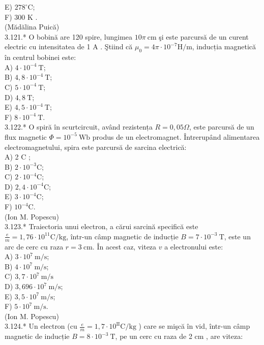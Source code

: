 \documentclass[10pt]{article}
\begin{document}
E) $278^{\circ} \mathrm{C}$;\\
F) 300 K .\\
(Mădălina Puică)\\
3.121.* O bobină are 120 spire, lungimea $10 \pi \mathrm{~cm}$ şi este parcursă de un curent electric cu intensitatea de 1 A . Ştiind că $\mu_{0}=4 \pi \cdot 10^{-7} \mathrm{H} / \mathrm{m}$, inducția magnetică în centrul bobinei este:\\
A) $4 \cdot 10^{-4} \mathrm{~T}$;\\
B) $4,8 \cdot 10^{-4} \mathrm{~T}$;\\
C) $5 \cdot 10^{-4} \mathrm{~T}$;\\
D) $4,8 \mathrm{~T}$;\\
E) $4,5 \cdot 10^{-4} \mathrm{~T}$;\\
F) $8 \cdot 10^{-4} \mathrm{~T}$.\\
3.122.* O spiră în scurtcircuit, având rezistența $R=0,05 \Omega$, este parcursă de un flux magnetic $\Phi=10^{-5} \mathrm{~Wb}$ produs de un electromagnet. Întrerupând alimentarea electromagnetului, spira este parcursă de sarcina electrică:\\
A) 2 C ;\\
B) $2 \cdot 10^{-3} \mathrm{C}$;\\
C) $2 \cdot 10^{-4} \mathrm{C}$;\\
D) $2,4 \cdot 10^{-4} \mathrm{C}$;\\
E) $3 \cdot 10^{-4} \mathrm{C}$;\\
F) $10^{-4} \mathrm{C}$.\\
(Ion M. Popescu)\\
3.123.* Traiectoria unui electron, a cărui sarcină specifică este $\frac{e}{m}=1,76 \cdot 10^{11} \mathrm{C} / \mathrm{kg}$, într-un câmp magnetic de inducție $B=7 \cdot 10^{-3} \mathrm{~T}$, este un arc de cerc cu raza $r=3 \mathrm{~cm}$. În acest caz, viteza $v$ a electronului este:\\
A) $3 \cdot 10^{7} \mathrm{~m} / \mathrm{s}$;\\
B) $4 \cdot 10^{7} \mathrm{~m} / \mathrm{s}$;\\
C) $3,7 \cdot 10^{7} \mathrm{~m} / \mathrm{s}$\\
D) $3,696 \cdot 10^{7} \mathrm{~m} / \mathrm{s}$;\\
E) $3,5 \cdot 10^{7} \mathrm{~m} / \mathrm{s}$;\\
F) $5 \cdot 10^{7} \mathrm{~m} / \mathrm{s}$.\\
(Ion M. Popescu)\\
3.124.* Un electron (cu $\frac{e}{m}=1,7 \cdot 10^{\mathrm{II}} \mathrm{C} / \mathrm{kg}$ ) care se mişcă în vid, într-un câmp magnetic de inducție $B=8 \cdot 10^{-3} \mathrm{~T}$, pe un cerc cu raza de 2 cm , are viteza:\\
\end{document}
